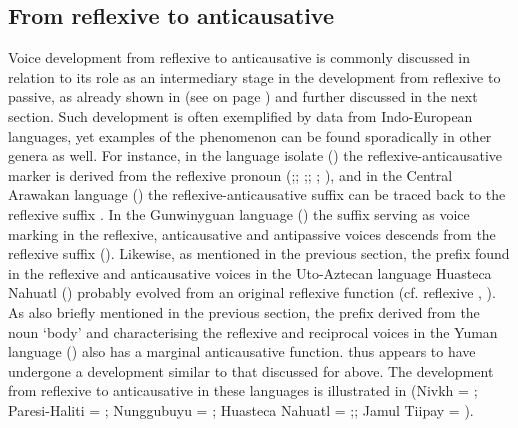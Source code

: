 \subsection{From reflexive to anticausative} \label{diachrony:refl2antc}
Voice development from reflexive to anticausative is commonly discussed in relation to its role as an intermediary stage in the development from reflexive to passive, as already shown in  (see  on page \pageref{fig:ch7:unidirectional}) and further discussed in the next section. Such development is often exemplified by data from Indo-European languages, yet examples of the phenomenon can be found sporadically in other genera as well. For instance, in the language isolate  () the reflexive-anticausative marker  is derived from the reflexive pronoun  (\citealt[191f.]{nedjalkov:otaina:1981};; \citeyear[108f.]{nedjalkov:otaina:2013};; \citealt[44]{haspelmath:1990}; \citealt{nedjalkov:al:1995}), and in the Central Arawakan language  () the reflexive-anticausative suffix  can be traced back to the  reflexive suffix  \citep[109f.]{wise:1990}. In the Gunwinyguan language  () the suffix  serving as voice marking in the reflexive, anticausative and antipassive voices descends from the  reflexive suffix  (). Likewise, as mentioned in the previous section, the prefix  found in the reflexive and anticausative voices in the Uto-Aztecan language Huasteca Nahuatl () probably evolved from an original reflexive function (cf.  reflexive , \citealt{langacker:1976}). As also briefly mentioned in the previous section, the prefix  derived from the noun  ‘body’ and characterising the reflexive and reciprocal voices in the Yuman language  () also has a marginal anticausative function.  thus appears to have undergone a development similar to that discussed for  above. The development from reflexive to anticausative in these languages is illustrated in  (Nivkh = \citealt[69]{nedjalkov:al:1995}; Paresi-Haliti = \citealt[248f., 255]{brandao:2014}; Nunggubuyu = \citealt[390]{heath:1984}; Huasteca Nahuatl = \citealt[90ff.]{llanes:al:2017};; Jamul Tiipay = \citealt[166f.]{miller:a:2001}).

